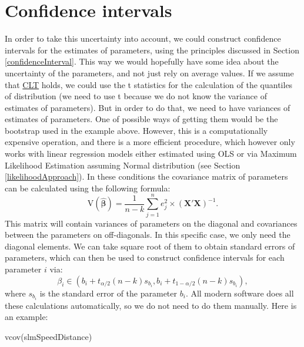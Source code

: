 \documentclass[
]{book}
\newenvironment{Shaded}{\begin{snugshade}}{\end{snugshade}}
\newcommand{\FunctionTok}[1]{\textcolor[rgb]{0.00,0.00,0.00}{#1}}
\newcommand{\NormalTok}[1]{#1}
\theoremstyle{definition}
\theoremstyle{definition}
\theoremstyle{definition}
\theoremstyle{definition}
\theoremstyle{remark}
\begin{document}
\hypertarget{confidence-intervals}{%
\section{Confidence intervals}\label{confidence-intervals}}

In order to take this uncertainty into account, we could construct confidence intervals for the estimates of parameters, using the principles discussed in Section \ref{confidenceInterval}. This way we would hopefully have some idea about the uncertainty of the parameters, and not just rely on average values. If we assume that \protect\hyperlink{CLT}{CLT} holds, we could use the t statistics for the calculation of the quantiles of distribution (we need to use t because we do not know the variance of estimates of parameters). But in order to do that, we need to have variances of estimates of parameters. One of possible ways of getting them would be the bootstrap used in the example above. However, this is a computationally expensive operation, and there is a more efficient procedure, which however only works with linear regression models either estimated using OLS or via Maximum Likelihood Estimation assuming Normal distribution (see Section \ref{likelihoodApproach}). In these conditions the covariance matrix of parameters can be calculated using the following formula:
\begin{equation}
    \mathrm{V}(\hat{\boldsymbol{\beta}}) = \frac{1}{n-k} \sum_{j=1}^n e_j^2 \times \left(\mathbf{X}' \mathbf{X}\right)^{-1}.
    \label{eq:MLRcovarianceMatrix}
\end{equation}
This matrix will contain variances of parameters on the diagonal and covariances between the parameters on off-diagonals. In this specific case, we only need the diagonal elements. We can take square root of them to obtain standard errors of parameters, which can then be used to construct confidence intervals for each parameter \(i\) via:
\begin{equation}
    \beta_i \in (b_i + t_{\alpha/2}(n-k) s_{b_i}, b_i + t_{1-\alpha/2}(n-k) s_{b_i}),
    \label{eq:MLRcovarianceMatrix}
\end{equation}
where \(s_{b_i}\) is the standard error of the parameter \(b_i\). All modern software does all these calculations automatically, so we do not need to do them manually. Here is an example:

\begin{Shaded}
\begin{Highlighting}[]
\FunctionTok{vcov}\NormalTok{(slmSpeedDistance)}
\end{Highlighting}
\end{Shaded}
\end{document}
